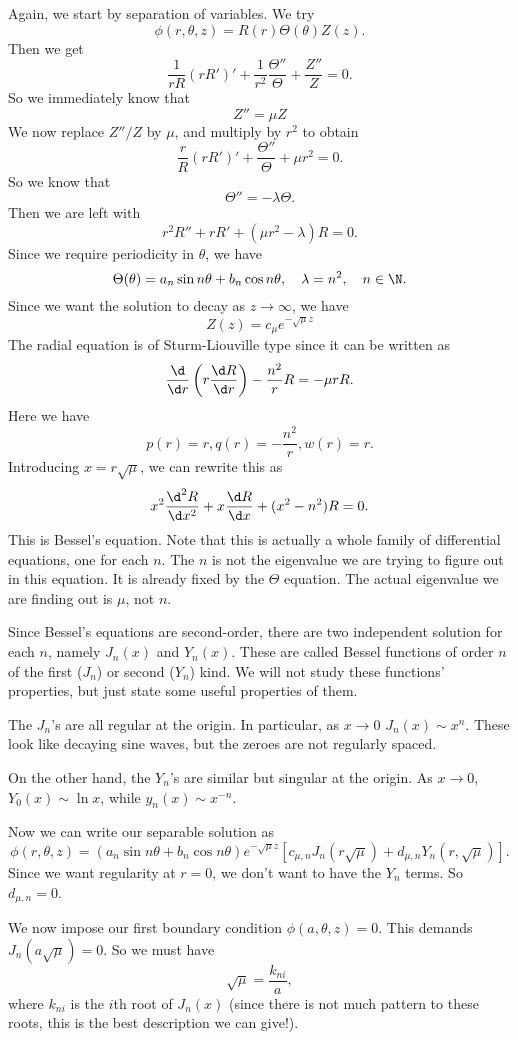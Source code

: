 \documentclass[a4paper]{article}
\begin{document}
Again, we start by separation of variables. We try
\[
  \phi(r, \theta, z) = R(r) \Theta(\theta)Z(z).
\]
Then we get
\[
  \frac{1}{rR} (rR')' + \frac{1}{r^2}\frac{\Theta''}{\Theta} + \frac{Z''}{Z} = 0.
\]
So we immediately know that
\[
  Z'' = \mu Z
\]
We now replace $Z''/Z$ by $\mu$, and multiply by $r^2$ to obtain
\[
  \frac{r}{R}(rR')' + \frac{\Theta''}{\Theta} + \mu r^2 = 0.
\]
So we know that
\[
  \Theta'' = -\lambda \Theta.
\]
Then we are left with
\[
  r^2 R'' + rR' + (\mu r^2 - \lambda)R = 0.
\]
Since we require periodicity in $\theta$, we have
\[
  \Theta(\theta) = a_n \sin n\theta + b_n \cos n\theta, \quad \lambda = n^2,\quad n \in \N.
\]
Since we want the solution to decay as $z \to \infty$, we have
\[
  Z(z) = c_\mu e^{-\sqrt{\mu}z}
\]
The radial equation is of Sturm-Liouville type since it can be written as
\[
  \frac{\d}{\d r}\left(r \frac{\d R}{\d r}\right) - \frac{n^2}{r}R = -\mu rR.
\]
Here we have
\[
  p(r) = r, q(r) = -\frac{n^2}{r}, w(r) = r.
\]
Introducing $x = r\sqrt{\mu}$, we can rewrite this as
\[
  x^2 \frac{\d^2 R}{\d x^2} + x\frac{\d R}{\d x} + (x^2 - n^2)R = 0.
\]
This is Bessel's equation. Note that this is actually a whole family of differential equations, one for each $n$. The $n$ is not the eigenvalue we are trying to figure out in this equation. It is already fixed by the $\Theta$ equation.  The actual eigenvalue we are finding out is $\mu$, not $n$.

Since Bessel's equations are second-order, there are two independent solution for each $n$, namely $J_n(x)$ and $Y_n(x)$. These are called Bessel functions of order $n$ of the first ($J_n$) or second ($Y_n$) kind. We will not study these functions' properties, but just state some useful properties of them.

The $J_n$'s are all regular at the origin. In particular, as $x \to 0$ $J_n (x) \sim x^n$. These look like decaying sine waves, but the zeroes are not regularly spaced.

On the other hand, the $Y_n$'s are similar but singular at the origin. As $x \to 0$, $Y_0(x) \sim \ln x$, while $y_n(x) \sim x^{-n}$.

Now we can write our separable solution as
\[
  \phi(r, \theta, z) = (a_n \sin n \theta + b_n \cos n\theta) e^{-\sqrt{\mu}z} [c_{\mu, n}J_n (r\sqrt{\mu}) + d_{\mu, n}Y_n (r, \sqrt{\mu})].
\]
Since we want regularity at $r = 0$, we don't want to have the $Y_n$ terms. So $d_{\mu, n} = 0$.

We now impose our first boundary condition $\phi(a, \theta, z) = 0$. This demands $J_n(a \sqrt{\mu}) = 0$. So we must have
\[
  \sqrt{\mu} = \frac{k_{ni}}{a},
\]
where $k_{ni}$ is the $i$th root of $J_n(x)$ (since there is not much pattern to these roots, this is the best description we can give!).
\end{document}
